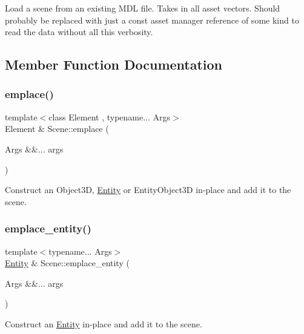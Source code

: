 Load a scene from an existing M\+DL file. Takes in all asset vectors. Should probably be replaced with just a const asset manager reference of some kind to read the data without all this verbosity. 

\subsection{Member Function Documentation}
\mbox{\label{class_scene_ab49d36bd44583a0374eedf41ccce75d3}} 
\subsubsection{\texorpdfstring{emplace()}{emplace()}}
{\footnotesize\ttfamily template$<$class Element , typename... Args$>$ \\
Element \& Scene\+::emplace (\begin{DoxyParamCaption}\item[{Args \&\&...}]{args }\end{DoxyParamCaption})}

Construct an Object3D, \mbox{\hyperlink{class_entity}{Entity}} or Entity\+Object3D in-\/place and add it to the scene. \mbox{\label{class_scene_aabb437a52d2cdbcd254136d5bc1f2df9}} 
\subsubsection{\texorpdfstring{emplace\+\_\+entity()}{emplace\_entity()}}
{\footnotesize\ttfamily template$<$typename... Args$>$ \\
\mbox{\hyperlink{class_entity}{Entity}} \& Scene\+::emplace\+\_\+entity (\begin{DoxyParamCaption}\item[{Args \&\&...}]{args }\end{DoxyParamCaption})}

Construct an \mbox{\hyperlink{class_entity}{Entity}} in-\/place and add it to the scene. \mbox{\label{class_scene_a21cc42914ddcf79521435cef280857c2}} 
